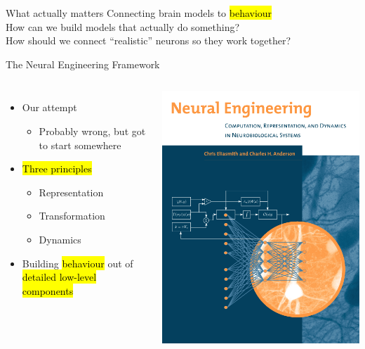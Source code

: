 \documentclass[handout,aspectratio=169]{beamer}
\begin{document}
\begin{frame}{What actually matters\textellipsis}
	Connecting brain models to \hl{behaviour}\\[0.25cm]
	\pause
	How can we build models that actually do something?\\[0.25cm]
	\pause
	How should we connect \enquote{realistic} neurons so they work together?\\[0.25cm]
\end{frame}

\begin{frame}{The Neural Engineering Framework}
	\begin{columns}
		\begin{itemize}
			\setlength{\itemsep}{0.25cm}
			\item Our attempt\\[0.125cm]
			\begin{itemize}
				\item Probably wrong, but got to start somewhere
			\end{itemize}
			\item \hl{Three principles}\\[0.125cm]
			\begin{itemize}
				\setlength{\itemsep}{0.25cm}
				\item Representation
				\item Transformation
				\item Dynamics
			\end{itemize}
			\item Building \hl{behaviour} out of \hl{detailed low-level components}
		\end{itemize}
		\includegraphics[width=\textwidth]{media/neural_engineering_cover.png}

\end{columns}
\end{frame}
\end{document}
